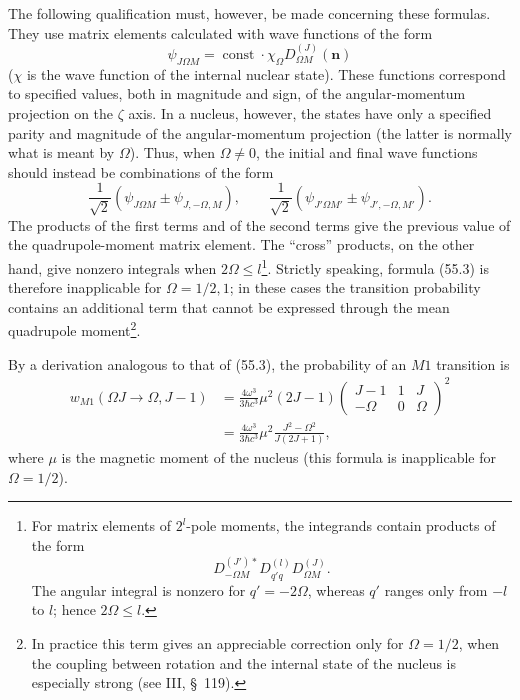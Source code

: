 The following qualification must, however, be made concerning these formulas. They use matrix elements calculated with wave functions of the form
\[
\psi_{J\Omega M}=\operatorname{const}\cdot\chi_\Omega D_{\Omega M}^{(J)}(\mathbf n)
\]
($\chi$ is the wave function of the internal nuclear state). These functions correspond to specified values, both in magnitude and sign, of the angular-momentum projection on the $\zeta$ axis. In a nucleus, however, the states have only a specified parity and magnitude of the angular-momentum projection (the latter is normally what is meant by $\Omega$). Thus, when $\Omega\ne0$, the initial and final wave functions should instead be combinations of the form
\[
\frac1{\sqrt2}(\psi_{J\Omega M}\pm\psi_{J,-\Omega,M}),\qquad
\frac1{\sqrt2}(\psi_{J'\Omega M'}\pm\psi_{J',-\Omega,M'}).
\]
The products of the first terms and of the second terms give the previous value of the quadrupole-moment matrix element. The ``cross'' products, on the other hand, give nonzero integrals when $2\Omega\leqslant l$\footnote{For matrix elements of $2^l$-pole moments, the integrands contain products of the form
\[
D_{-\Omega M}^{(J')*}D_{q'q}^{(l)}D_{\Omega M}^{(J)}.
\]
The angular integral is nonzero for $q'=-2\Omega$, whereas $q'$ ranges only from $-l$ to $l$; hence $2\Omega\leqslant l$.}. Strictly speaking, formula (55.3) is therefore inapplicable for $\Omega=1/2,1$; in these cases the transition probability contains an additional term that cannot be expressed through the mean quadrupole moment\footnote{In practice this term gives an appreciable correction only for $\Omega=1/2$, when the coupling between rotation and the internal state of the nucleus is especially strong (see III, \S~119).}.

By a derivation analogous to that of (55.3), the probability of an $M1$ transition is
\begin{equation}
\begin{aligned}
w_{M1}(\Omega J\to\Omega,J-1)
&=\frac{4\omega^3}{3\hbar c^3}\mu^2(2J-1)
\begin{pmatrix}J-1&1&J\\-\Omega&0&\Omega\end{pmatrix}^{\!2}\\
&=\frac{4\omega^3}{3\hbar c^3}\mu^2
\frac{J^2-\Omega^2}{J(2J+1)},
\end{aligned}
\tag{55.4}
\end{equation}
where $\mu$ is the magnetic moment of the nucleus (this formula is inapplicable for $\Omega=1/2$).
